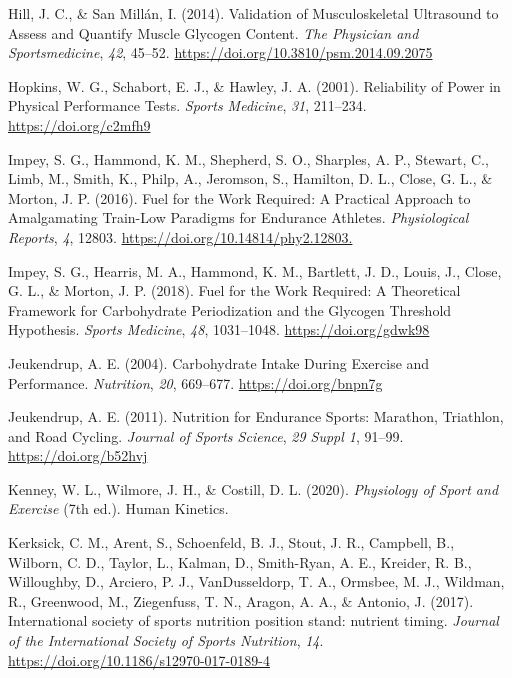 \documentclass[]{cik}%
\newlength{\cslhangindent}
\newlength{\cslentryspacingunit} %
\newenvironment{CSLReferences}[2] %
 {%
  \setlength{\parindent}{0pt}
  \ifodd #1
  \let\oldpar\par
  \def\par{\hangindent=\cslhangindent\oldpar}
  \fi
  \setlength{\parskip}{#2\cslentryspacingunit}
 }%
 {}
\begin{document}
\begin{CSLReferences}{1}{0}
\leavevmode{}%
Hill, J. C., \& San Millán, I. (2014). Validation of Musculoskeletal
Ultrasound to Assess and Quantify Muscle Glycogen Content. \emph{The
Physician and Sportsmedicine}, \emph{42}, 45--52.
\url{https://doi.org/10.3810/psm.2014.09.2075}

\leavevmode{}%
Hopkins, W. G., Schabort, E. J., \& Hawley, J. A. (2001). Reliability of
Power in Physical Performance Tests. \emph{Sports Medicine}, \emph{31},
211--234. \url{https://doi.org/c2mfh9}

\leavevmode{}%
Impey, S. G., Hammond, K. M., Shepherd, S. O., Sharples, A. P., Stewart,
C., Limb, M., Smith, K., Philp, A., Jeromson, S., Hamilton, D. L.,
Close, G. L., \& Morton, J. P. (2016). Fuel for the Work Required: A
Practical Approach to Amalgamating Train-Low Paradigms for Endurance
Athletes. \emph{Physiological Reports}, \emph{4}, 12803.
\url{https://doi.org/10.14814/phy2.12803.}

\leavevmode{}%
Impey, S. G., Hearris, M. A., Hammond, K. M., Bartlett, J. D., Louis,
J., Close, G. L., \& Morton, J. P. (2018). Fuel for the Work Required: A
Theoretical Framework for Carbohydrate Periodization and the Glycogen
Threshold Hypothesis. \emph{Sports Medicine}, \emph{48}, 1031--1048.
\url{https://doi.org/gdwk98}

\leavevmode{}%
Jeukendrup, A. E. (2004). Carbohydrate Intake During Exercise and
Performance. \emph{Nutrition}, \emph{20}, 669--677.
\url{https://doi.org/bnpn7g}

\leavevmode{}%
Jeukendrup, A. E. (2011). Nutrition for Endurance Sports: Marathon,
Triathlon, and Road Cycling. \emph{Journal of Sports Science}, \emph{29
Suppl 1}, 91--99. \url{https://doi.org/b52hvj}

\leavevmode{}%
Kenney, W. L., Wilmore, J. H., \& Costill, D. L. (2020).
\emph{Physiology of Sport and Exercise} (7th ed.). Human Kinetics.

\leavevmode{}%
Kerksick, C. M., Arent, S., Schoenfeld, B. J., Stout, J. R., Campbell,
B., Wilborn, C. D., Taylor, L., Kalman, D., Smith-Ryan, A. E., Kreider,
R. B., Willoughby, D., Arciero, P. J., VanDusseldorp, T. A., Ormsbee, M.
J., Wildman, R., Greenwood, M., Ziegenfuss, T. N., Aragon, A. A., \&
Antonio, J. (2017). International society of sports nutrition position
stand: nutrient timing. \emph{Journal of the International Society of
Sports Nutrition}, \emph{14}.
\url{https://doi.org/10.1186/s12970-017-0189-4}


\end{CSLReferences}
\end{document}
